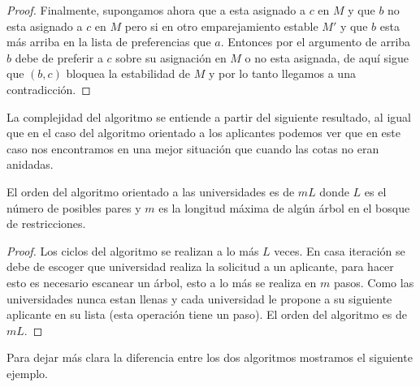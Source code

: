 \begin{proof}
Finalmente, supongamos ahora que a esta asignado a $c$ en $M$ y que $b$ no esta asignado a $c$ en $M$ pero si en otro emparejamiento estable $M'$ y que $b$ esta más arriba en la lista de preferencias que $a$. Entonces por el argumento de arriba $b$ debe de preferir a $c$ sobre su asignación en $M$ o no esta asignada, de aquí sigue que $(b,c)$ bloquea la estabilidad de $M$ y por lo tanto llegamos a una contradicción. 
\end{proof}

La complejidad del algoritmo se entiende a partir del siguiente resultado, al igual que en el caso del algoritmo orientado a los aplicantes podemos ver que en este caso nos encontramos en una mejor situación que cuando las cotas no eran anidadas. 

\begin{teo}
El orden del algoritmo orientado a las universidades es de $mL$ donde $L$ es el número de posibles pares y $m$ es la longitud máxima de algún árbol en el bosque de restricciones. 
\end{teo}

\begin{proof}
Los ciclos del algoritmo se realizan a lo más $L$ veces. En casa iteración se debe de escoger que universidad realiza la solicitud a un aplicante, para hacer esto es necesario escanear un árbol, esto a lo más se realiza en $m$ pasos. Como las universidades nunca estan llenas y cada universidad le propone a su siguiente aplicante en su lista (esta operación tiene un paso). El orden del algoritmo es de $mL$.
\end{proof}

Para dejar más clara la diferencia entre los dos algoritmos mostramos el siguiente ejemplo.

